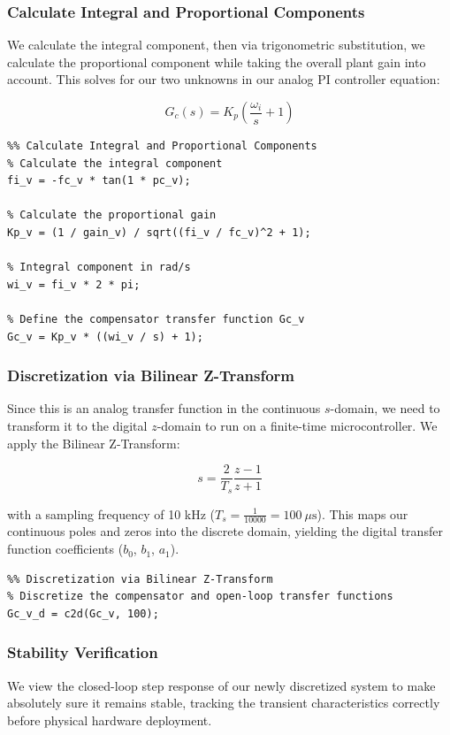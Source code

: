 \subsubsection{Calculate Integral and Proportional Components}
We calculate the integral component, then via trigonometric substitution, we calculate the proportional component while taking the overall plant gain into account. This solves for our two unknowns in our analog PI controller equation:

\begin{equation}
    G_c(s) = K_p \left( \frac{\omega_i}{s} + 1 \right)
\end{equation}

\begin{lstlisting}
%% Calculate Integral and Proportional Components
% Calculate the integral component
fi_v = -fc_v * tan(1 * pc_v);

% Calculate the proportional gain
Kp_v = (1 / gain_v) / sqrt((fi_v / fc_v)^2 + 1);

% Integral component in rad/s
wi_v = fi_v * 2 * pi;

% Define the compensator transfer function Gc_v
Gc_v = Kp_v * ((wi_v / s) + 1);
\end{lstlisting}

\subsubsection{Discretization via Bilinear Z-Transform}
Since this is an analog transfer function in the continuous $s$-domain, we need to transform it to the digital $z$-domain to run on a finite-time microcontroller. We apply the Bilinear Z-Transform:

\begin{equation}
    s = \frac{2}{T_s} \frac{z - 1}{z + 1}
\end{equation}

with a sampling frequency of 10 kHz ($T_s = \frac{1}{10000} = 100\ \mu\text{s}$). This maps our continuous poles and zeros into the discrete domain, yielding the digital transfer function coefficients ($b_0$, $b_1$, $a_1$).

\begin{lstlisting}
%% Discretization via Bilinear Z-Transform
% Discretize the compensator and open-loop transfer functions
Gc_v_d = c2d(Gc_v, 100);
\end{lstlisting}

\subsubsection{Stability Verification}
We view the closed-loop step response of our newly discretized system to make absolutely sure it remains stable, tracking the transient characteristics correctly before physical hardware deployment.

